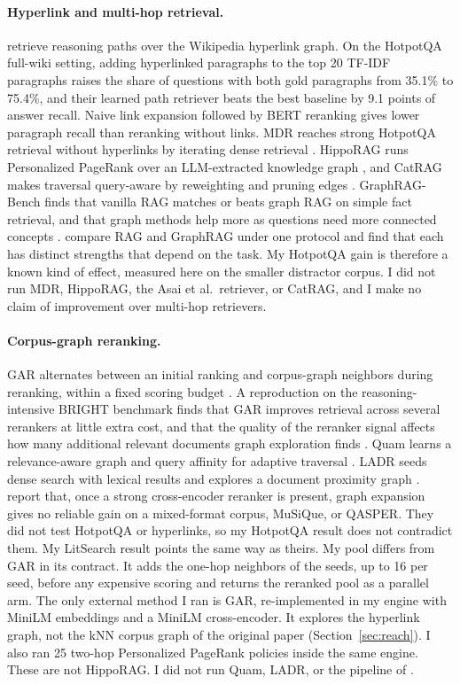 \documentclass[10pt,twocolumn]{article}
\begin{document}
\paragraph{Hyperlink and multi-hop retrieval.}
\citet{asai2020paths} retrieve reasoning paths over the Wikipedia hyperlink
graph. On the HotpotQA full-wiki setting, adding hyperlinked paragraphs to the
top 20 TF-IDF paragraphs raises the share of questions with both gold
paragraphs from 35.1\% to 75.4\%, and their learned path retriever beats the
best baseline by 9.1 points of answer recall. Naive link expansion followed by
BERT reranking gives lower paragraph recall than reranking without links. MDR reaches strong HotpotQA retrieval without
hyperlinks by iterating dense retrieval \citep{xiong2021mdr}. HippoRAG runs
Personalized PageRank over an LLM-extracted knowledge graph
\citep{gutierrez2024hipporag,gutierrez2025hipporag2}, and CatRAG makes traversal
query-aware by reweighting and pruning edges \citep{lau2026catrag}.
GraphRAG-Bench finds that vanilla RAG matches or beats graph RAG on simple fact
retrieval, and that graph methods help more as questions need more connected
concepts \citep{xiang2026when}. \citet{han2025ragvsgraphrag} compare RAG and
GraphRAG under one protocol and find that each has distinct strengths that
depend on the task. My HotpotQA gain is therefore a known kind
of effect, measured here on the smaller distractor corpus. I did not run MDR, HippoRAG,
the Asai et al.\ retriever, or CatRAG, and I make no claim of improvement over
multi-hop retrievers.

\paragraph{Corpus-graph reranking.}
GAR alternates between an initial ranking and corpus-graph neighbors during
reranking, within a fixed scoring budget \citep{macavaney2022gar}. A
reproduction on the reasoning-intensive BRIGHT benchmark finds that GAR
improves retrieval across several rerankers at little extra cost, and that the
quality of the reranker signal affects how many additional relevant documents
graph exploration finds \citep{rathee2026reproducing}. Quam learns a relevance-aware graph and query
affinity for adaptive traversal \citep{rathee2024quam}. LADR seeds dense search
with lexical results and explores a document proximity graph
\citep{kulkarni2023ladr}. \citet{singh2026beyond} report that, once a strong
cross-encoder reranker is present, graph expansion gives no reliable gain on a
mixed-format corpus, MuSiQue, or QASPER. They did not test HotpotQA or hyperlinks, so
my HotpotQA result does not contradict them. My LitSearch result points the
same way as theirs. My pool differs from GAR in its contract. It adds
the one-hop neighbors of the seeds, up to 16 per seed, before any expensive
scoring and returns
the reranked pool as a parallel arm. The only external method I
ran is GAR, re-implemented in my engine with MiniLM embeddings and a MiniLM
cross-encoder. It explores the hyperlink graph, not the kNN corpus graph of
the original paper (Section~\ref{sec:reach}). I also ran 25
two-hop Personalized PageRank policies inside the same engine. These are not
HippoRAG. I did not run Quam, LADR, or the pipeline of \citet{singh2026beyond}.
\end{document}
